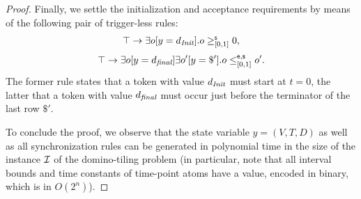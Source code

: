 \begin{proof}
Finally, we settle the initialization and acceptance requirements by means of the following pair of trigger-less rules:
\[
    \operatorname{\top} \to \exists o[y=d_{\textit{Init}}]. o\geq^{\mathsf{s}}_{[0,1]} 0,
\]
\[
    \operatorname{\top} \to \exists o[y=d_{\textit{final}}]\exists o'[y=\$']. o\leq^{\mathsf{e},\mathsf{s}}_{[0,1]} o'.
\]
The former rule states that a token with value $d_{\textit{Init}}$ must start at $t=0$, the latter that a
token with value $d_{\textit{final}}$ must occur just before the terminator of the last row $\$'$.


To conclude the proof, we observe that the state variable $y=(V,T,D)$ as well as all synchronization rules can be generated in polynomial time in the size of the instance $\mathcal{I}$ of the domino-tiling problem (in particular, note that all interval bounds and time constants of time-point atoms have a value, encoded in binary, which is in $O(2^n)$).
\end{proof}